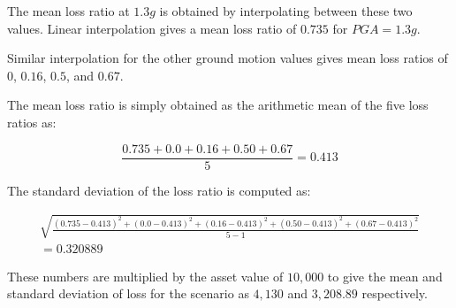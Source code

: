 The mean loss ratio at $1.3 g$ is obtained by interpolating between these two values. Linear interpolation gives a mean loss ratio of $0.735$ for $PGA = 1.3 g$.

Similar interpolation for the other ground motion values gives mean loss ratios of $0$, $0.16$, $0.5$, and $0.67$.

The mean loss ratio is simply obtained as the arithmetic mean of the five loss ratios as:

\begin{equation*}
\frac{0.735 + 0.0 + 0.16 + 0.50 + 0.67}{5} = 0.413
\end{equation*}

The standard deviation of the loss ratio is computed as:

\begin{multline*}
\sqrt{\frac{(0.735 - 0.413)^2 + (0.0 - 0.413)^2 + (0.16 - 0.413)^2 + (0.50 - 0.413)^2 + (0.67 - 0.413)^2}{5 - 1}} \\
= 0.320889
\end{multline*}

These numbers are multiplied by the asset value of $10,000$ to give the mean and standard deviation of loss for the scenario as $4,130$ and $3,208.89$ respectively.